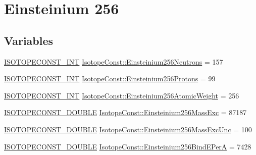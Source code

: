 \hypertarget{group___isotope_const-_einsteinium-_es256}{}\section{Einsteinium 256}
\label{group___isotope_const-_einsteinium-_es256}
\subsection*{Variables}
\begin{DoxyCompactItemize}
\item 
\mbox{\hyperlink{group___isotope_const-_macros_ga5f18360b3e99483a35c32d789e62621c}{I\+S\+O\+T\+O\+P\+E\+C\+O\+N\+S\+T\+\_\+\+I\+NT}} \mbox{\hyperlink{group___isotope_const-_einsteinium-_es256_ga54d628b85b091af71265f948021e9541}{Isotope\+Const\+::\+Einsteinium256\+Neutrons}} = 157
\item 
\mbox{\hyperlink{group___isotope_const-_macros_ga5f18360b3e99483a35c32d789e62621c}{I\+S\+O\+T\+O\+P\+E\+C\+O\+N\+S\+T\+\_\+\+I\+NT}} \mbox{\hyperlink{group___isotope_const-_einsteinium-_es256_ga4efcd363bb6db3be6094b151478b035b}{Isotope\+Const\+::\+Einsteinium256\+Protons}} = 99
\item 
\mbox{\hyperlink{group___isotope_const-_macros_ga5f18360b3e99483a35c32d789e62621c}{I\+S\+O\+T\+O\+P\+E\+C\+O\+N\+S\+T\+\_\+\+I\+NT}} \mbox{\hyperlink{group___isotope_const-_einsteinium-_es256_gac63b48bbca5c2c8831d8d5adc2755b47}{Isotope\+Const\+::\+Einsteinium256\+Atomic\+Weight}} = 256
\item 
\mbox{\hyperlink{group___isotope_const-_macros_ga8f45a7272ce02c0b4c65c44636ed719a}{I\+S\+O\+T\+O\+P\+E\+C\+O\+N\+S\+T\+\_\+\+D\+O\+U\+B\+LE}} \mbox{\hyperlink{group___isotope_const-_einsteinium-_es256_ga7f49dc5de7ff72a6a568a1c88a0ca416}{Isotope\+Const\+::\+Einsteinium256\+Mass\+Exc}} = 87187
\item 
\mbox{\hyperlink{group___isotope_const-_macros_ga8f45a7272ce02c0b4c65c44636ed719a}{I\+S\+O\+T\+O\+P\+E\+C\+O\+N\+S\+T\+\_\+\+D\+O\+U\+B\+LE}} \mbox{\hyperlink{group___isotope_const-_einsteinium-_es256_gae26d4d243dcc2b2c2ff600ae8cb8613c}{Isotope\+Const\+::\+Einsteinium256\+Mass\+Exc\+Unc}} = 100
\item 
\mbox{\hyperlink{group___isotope_const-_macros_ga8f45a7272ce02c0b4c65c44636ed719a}{I\+S\+O\+T\+O\+P\+E\+C\+O\+N\+S\+T\+\_\+\+D\+O\+U\+B\+LE}} \mbox{\hyperlink{group___isotope_const-_einsteinium-_es256_ga1014931d98f67c987065b9a478c31873}{Isotope\+Const\+::\+Einsteinium256\+Bind\+E\+PerA}} = 7428
\item 

\end{DoxyCompactItemize}
